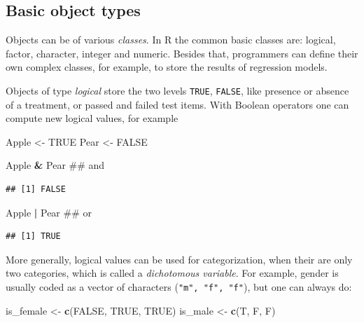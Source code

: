 \documentclass[]{svmono}
\newenvironment{Shaded}{\begin{snugshade}}{\end{snugshade}}
\newcommand{\KeywordTok}[1]{\textcolor[rgb]{0.13,0.29,0.53}{\textbf{#1}}}
\newcommand{\StringTok}[1]{\textcolor[rgb]{0.31,0.60,0.02}{#1}}
\newcommand{\OtherTok}[1]{\textcolor[rgb]{0.56,0.35,0.01}{#1}}
\newcommand{\OperatorTok}[1]{\textcolor[rgb]{0.81,0.36,0.00}{\textbf{#1}}}
\newcommand{\NormalTok}[1]{#1}
\theoremstyle{definition}
\theoremstyle{definition}
\theoremstyle{definition}
\theoremstyle{remark}
\begin{document}
\subsection{Basic object types}\label{basic-object-types}

Objects can be of various \emph{classes}. In R the common basic classes
are: logical, factor, character, integer and numeric. Besides that,
programmers can define their own complex classes, for example, to store
the results of regression models.

Objects of type \emph{logical} store the two levels \texttt{TRUE},
\texttt{FALSE}, like presence or absence of a treatment, or passed and
failed test items. With Boolean operators one can compute new logical
values, for example

\begin{Shaded}
\begin{Highlighting}[]
\NormalTok{Apple <-}\StringTok{ }\OtherTok{TRUE}
\NormalTok{Pear  <-}\StringTok{ }\OtherTok{FALSE}

\NormalTok{Apple }\OperatorTok{&}\StringTok{ }\NormalTok{Pear ## and}
\end{Highlighting}
\end{Shaded}

\begin{verbatim}
## [1] FALSE
\end{verbatim}

\begin{Shaded}
\begin{Highlighting}[]
\NormalTok{Apple }\OperatorTok{|}\StringTok{ }\NormalTok{Pear ## or}
\end{Highlighting}
\end{Shaded}

\begin{verbatim}
## [1] TRUE
\end{verbatim}

More generally, logical values can be used for categorization, when
their are only two categories, which is called a \emph{dichotomous
variable}. For example, gender is usually coded as a vector of
characters (\texttt{"m",\ "f",\ "f"}), but one can always do:

\begin{Shaded}
\begin{Highlighting}[]
\NormalTok{is_female <-}\StringTok{ }\KeywordTok{c}\NormalTok{(}\OtherTok{FALSE}\NormalTok{, }\OtherTok{TRUE}\NormalTok{, }\OtherTok{TRUE}\NormalTok{)}
\NormalTok{is_male   <-}\StringTok{ }\KeywordTok{c}\NormalTok{(T, F, F)}
\end{Highlighting}
\end{Shaded}
\end{document}
